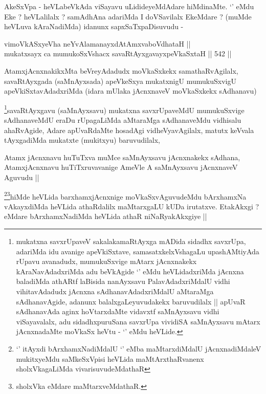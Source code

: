 \begin{artha}
AkeSxVpa - heVLabeVkAda viSayavu uLidideyeMdAdare hiMdinaMte. `\stext'
eMdu Eke ? heVLalilalx ? samAdhAna adariMda I doVSavilalx EkeMdare ?
(muMde heVLuva kAraNadiMda) idanunx sapxSaTxpaDisuvudu -
\end{artha}

\begin{shl}
vimoVkASxyeVha neYvAlamanayxdAtAmxvaboVdhataH || \\
mukatxsayx ca mumukoSxVshacx savaRtAyxgavayxpeVkaSxtaH ||  542 ||  
\end{shl}

\begin{artha}
AtamxjAcnxnakikxMta beVreyAdadudx moVkaSxkekx samathaRvAgilalx,
savaRtAyxgada (saMnAyxsada) apeVkeSxya mukatxnigU mumukuSxvigU
apeVkiSxtavAdadxriMda (idara mUlaka jAcnxnaveV moVkaSxkekx sAdhanavu)
\end{artha}


\begin{artha}
\footnote{mukatxna savxrUpaveV sakalakamaRtAyxga mADida sidadhx
  savxrUpa, adariMda idu avanige apeVkiSxtave, samasatxkelxVshagaLu
  upashAMtiyAda rUpavu avanadudx, mumukuSxvige mAtarx jAcnxnakekx
  kAraNavAdadxriMda adu beVkAgide `\stext' eMdu heVLidadxriMda jAcnxna
  baladiMda athARtf laBisida nanAyxsavu PalavAdadxriMdalU vidhi
  vihitavAdadudx jAcnxna sAdhanavAdadxriMdalU aMtaraMga sAdhanavAgide,
  adanunx balalxgaLeyuvudakekx baruvudilalx || apUvaR sAdhanavAda
  aginx hoVtarxdaMte vidavxtf saMnAyxsavu vidhi viSayavalalx, adu
  sidadhxpuruSana savxrUpa vividiSA saMnAyxsavu mAtarx jAcnxnadaMte
  moVkaSx heVtu - `\stext' eMdu heVLide.}savaRtAyxgavu (saMnAyxsavu) mukatxna savxrUpaveMdU
mumukuSxvige sAdhanaveMdU eraDu rUpagaLiMda aMtaraMga sAdhanaveMdu
vidhisalu ahaRvAgide, Adare apUvaRdaMte hosadAgi vidheVyavAgilalx,
matutx keVvala tAyxgadiMda mukatxte (mukitxyu) baruvudilalx, 
\end{artha}

\begin{artha}
Atamx jAcnxnavu huTuTxva muMce saMnAyxsavu jAcnxnakekx sAdhana,
AtamxjAcnxnavu huTiTxruvavanige AmeVle A saMnAyxsavu jAcnxnaveV
Aguvudu ||
\end{artha}

\begin{artha}
\footnote{`\stext' itAyxdi bArxhamxNadiMdalU `\stext' eMba
  maMtarxdiMdalU jAcnxnadiMdaleV mukitxyeMdu saMkeSxVpisi heVLida
  maMtArxthaRvanenx sholxVkagaLiMda
  vivarisuvudeMdathaR}\footnote{sholxVka eMdare maMtarxveMdathaR.}hiMde heVLida barxhamxjAcnxnige moVkaSxvAguvudeMdu
bArxhamxNa vAkayxdiMda heVLida athaRdalilx maMtarxgaLU kUDa
irutatxve. EtakAkxgi ? eMdare bArxhamxNadiMda heVLida athaR
niNaRyakAkxgiye ||
\end{artha}

